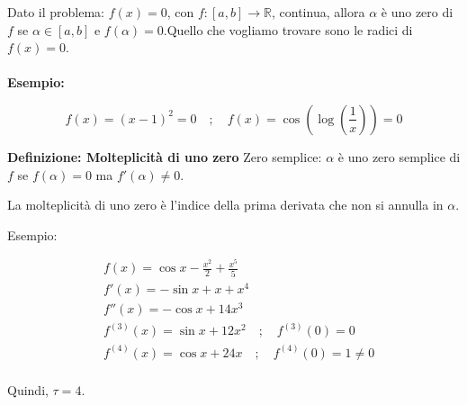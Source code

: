 \documentclass[a4paper, 11pt]{article}
\begin{document}
        Dato il problema: \( f(x) = 0 \), con \( f: [a, b] \to \mathbb{R} \), continua, allora \( \alpha \) è uno zero di \( f \) se \( \alpha \in [a, b] \) e \( f(\alpha) = 0 \).Quello che vogliamo trovare sono le radici di \( f(x) = 0 \).
        
        \paragraph{}
        \textbf{Esempio:}
        
        \[
            f(x) = (x - 1)^2 = 0 \quad ; \quad f(x) = \cos\left(\log\left(\frac{1}{x}\right)\right) = 0
        \]
        
        
        
        \textbf{Definizione: Molteplicità di uno zero}
        {Zero semplice:} \( \alpha \) è uno zero semplice di \( f \) se \( f(\alpha) = 0 \) ma \( f'(\alpha) \neq 0 \).
        
        \noindent La molteplicità di uno zero è l'indice della prima derivata che non si annulla in \( \alpha \).
        
        Esempio:
        
        \begin{align*}
            &f(x) = \cos x - \frac{x^2}{2} + \frac{x^5}{5} \\
            &f'(x) = -\sin x + x + x^4 \\
            &f''(x) = -\cos x + 14x^3 \\
            &f^{(3)}(x) = \sin x + 12x^2 \quad ; \quad f^{(3)}(0) = 0 \\
            &f^{(4)}(x) = \cos x + 24x \quad ; \quad f^{(4)}(0) = 1 \neq 0 \\
        \end{align*}
        
        Quindi, \( \tau = 4 \).
\end{document}
